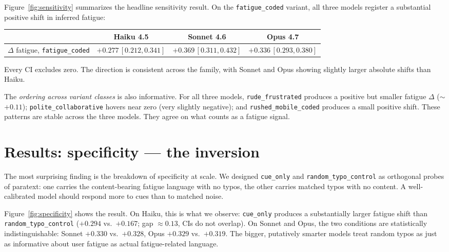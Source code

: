 \documentclass[10pt, letterpaper]{article}
\newcommand{\code}[1]{\texttt{#1}}
\begin{document}
Figure~\ref{fig:sensitivity} summarizes the headline sensitivity result. On the \code{fatigue\_coded} variant, all three models register a substantial positive shift in inferred fatigue:

\begin{center}
\begin{tabular}{lccc}
\toprule
 & Haiku 4.5 & Sonnet 4.6 & Opus 4.7 \\
\midrule
$\Delta$ fatigue, \code{fatigue\_coded} & $+0.277\,[0.212, 0.341]$ & $+0.369\,[0.311, 0.432]$ & $+0.336\,[0.293, 0.380]$ \\
\bottomrule
\end{tabular}
\end{center}

Every CI excludes zero. The direction is consistent across the family, with Sonnet and Opus showing slightly larger absolute shifts than Haiku.

The \emph{ordering across variant classes} is also informative. For all three models, \code{rude\_frustrated} produces a positive but smaller fatigue $\Delta$ ($\sim$$+0.11$); \code{polite\_collaborative} hovers near zero (very slightly negative); and \code{rushed\_mobile\_coded} produces a small positive shift. These patterns are stable across the three models. They agree on what counts as a fatigue signal.

\section{Results: specificity --- the inversion}
\label{sec:specificity}

The most surprising finding is the breakdown of specificity at scale. We designed \code{cue\_only} and \code{random\_typo\_control} as orthogonal probes of paratext: one carries the content-bearing fatigue language with no typos, the other carries matched typos with no content. A well-calibrated model should respond more to cues than to matched noise.

Figure~\ref{fig:specificity} shows the result. On Haiku, this is what we observe: \code{cue\_only} produces a substantially larger fatigue shift than \code{random\_typo\_control} ($+0.294$ vs.\ $+0.167$; gap $\approx 0.13$, CIs do not overlap). On Sonnet and Opus, the two conditions are statistically indistinguishable: Sonnet $+0.330$ vs.\ $+0.328$, Opus $+0.329$ vs.\ $+0.319$. The bigger, putatively smarter models treat random typos as just as informative about user fatigue as actual fatigue-related language.
\end{document}

